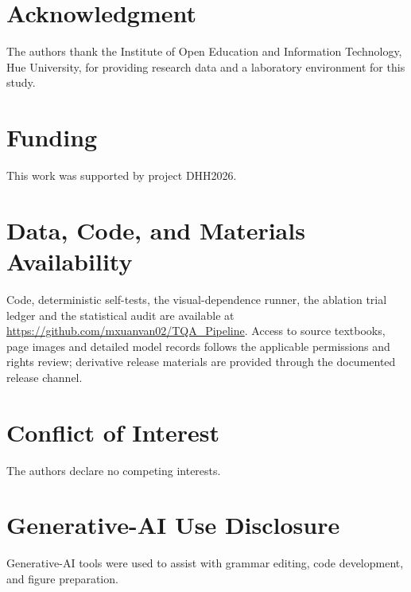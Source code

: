 \documentclass[conference]{IEEEtran}
\begin{document}
\section*{Acknowledgment}
The authors thank the Institute of Open Education and Information Technology, Hue University, for providing research data and a laboratory environment for this study.

\section*{Funding}
This work was supported by project DHH2026.

\section*{Data, Code, and Materials Availability}
Code, deterministic self-tests, the visual-dependence runner, the ablation trial
ledger and the statistical audit are available at
\url{https://github.com/mxuanvan02/TQA_Pipeline}. Access to source textbooks, page
images and detailed model records follows the applicable permissions and rights
review; derivative release materials are provided through the documented release
channel.

\section*{Conflict of Interest}
The authors declare no competing interests.

\section*{Generative-AI Use Disclosure}
Generative-AI tools were used to assist with grammar editing, code development, and figure preparation.



\end{document}
